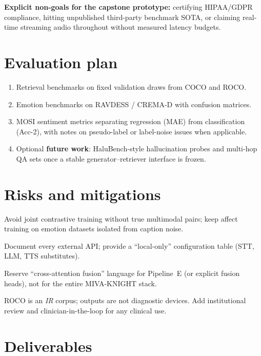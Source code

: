 \documentclass[12pt,a4paper]{article}
\begin{document}
\noindent
\textbf{Explicit non-goals for the capstone prototype:} certifying HIPAA/GDPR
compliance, hitting unpublished third-party benchmark SOTA, or claiming real-time
streaming audio throughout without measured latency budgets.

\section{Evaluation plan}

\begin{enumerate}[nosep]
  \item Retrieval benchmarks on fixed validation draws from COCO and ROCO.
  \item Emotion benchmarks on RAVDESS / CREMA-D with confusion matrices.
  \item MOSI sentiment metrics separating regression (MAE) from classification (Acc-2),
        with notes on pseudo-label or label-noise issues when applicable.
  \item Optional \textbf{future work}: HaluBench-style hallucination probes and multi-hop
        QA sets once a stable generator--retriever interface is frozen.
\end{enumerate}

\section{Risks and mitigations}

\begin{description}[style=nextline,font=\normalfont\bfseries]
  \item[Modality interference.] Avoid joint contrastive training without true multimodal
        pairs; keep affect training on emotion datasets isolated from caption noise.
  \item[Cloud dependence.] Document every external API; provide a ``local-only''
        configuration table (STT, LLM, TTS substitutes).
  \item[Over-claiming fusion.] Reserve ``cross-attention fusion'' language for
        Pipeline~E (or explicit fusion heads), not for the entire MIVA-KNIGHT stack.
  \item[Medical safety.] ROCO is an \emph{IR} corpus; outputs are not diagnostic
        devices. Add institutional review and clinician-in-the-loop for any clinical use.
\end{description}

\section{Deliverables}
\end{document}
